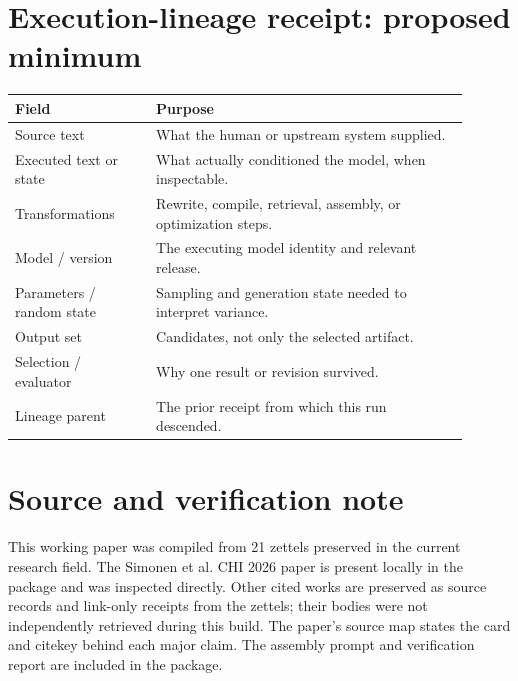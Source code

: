 \documentclass[11pt]{article}
\begin{document}
\section*{Execution-lineage receipt: proposed minimum}
\begin{center}\small
\begin{tabular}{p{0.28\linewidth}p{0.62\linewidth}}
\toprule
Field & Purpose\\\midrule
Source text & What the human or upstream system supplied.\\
Executed text or state & What actually conditioned the model, when inspectable.\\
Transformations & Rewrite, compile, retrieval, assembly, or optimization steps.\\
Model / version & The executing model identity and relevant release.\\
Parameters / random state & Sampling and generation state needed to interpret variance.\\
Output set & Candidates, not only the selected artifact.\\
Selection / evaluator & Why one result or revision survived.\\
Lineage parent & The prior receipt from which this run descended.\\
\bottomrule
\end{tabular}
\end{center}

\section*{Source and verification note}
This working paper was compiled from 21 zettels preserved in the current research field. The Simonen et al. CHI 2026 paper is present locally in the package and was inspected directly. Other cited works are preserved as source records and link-only receipts from the zettels; their bodies were not independently retrieved during this build. The paper's source map states the card and citekey behind each major claim. The assembly prompt and verification report are included in the package.
\end{document}
